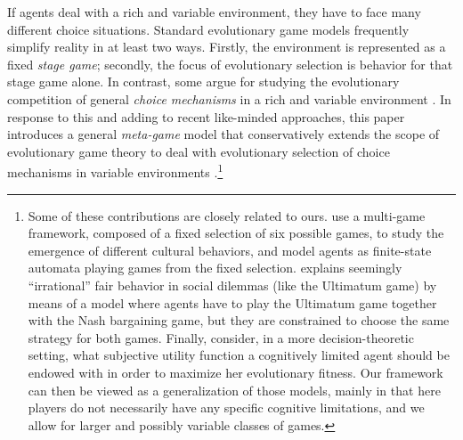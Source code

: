 \documentclass[fleqn,reqno,12pt]{article}
\theoremstyle{Satz}
\theoremstyle{Bsp}
\begin{document}

If agents deal with a rich and variable environment, they have to face many different choice
situations.  Standard evolutionary game models frequently simplify reality in at least two
ways. Firstly, the environment is represented as a fixed \emph{stage game}; secondly, the focus
of evolutionary selection is behavior for that stage game alone. In contrast, some argue for
studying the evolutionary competition of general \emph{choice mechanisms} in a rich and
variable environment
\citep[e.g.,][]{FawcettHamblin2013:Exposing-the-be,McNamara2013:Towards-a-Riche,HammStev12}. In
response to this and adding to recent like-minded approaches, this paper introduces a general
\emph{meta-game} model that conservatively extends the scope of evolutionary game theory to
deal with evolutionary selection of choice mechanisms in variable environments \citep[see
also][]{Harley1981:Learning-the-Ev,ZollmanSmead2010:Plasticity-and-,SmeadZollman2013:The-Stability-o,OConnor2016:Evolving-to-Gen,RayoBecker07,Zollman2008,SkyrmsZollman10,BednarPage07}.\footnote{Some
  of these contributions are closely related to ours. \citet{BednarPage07} use a
  multi-game framework, composed of a fixed selection of six possible games, to study the
  emergence of different cultural behaviors, and model agents as finite-state automata playing
  games from the fixed selection. \citet{Zollman2008} explains seemingly ``irrational'' fair
  behavior in social dilemmas (like the Ultimatum game) by means of a model where agents have
  to play the Ultimatum game together with the Nash bargaining game, but they are constrained
  to choose the same strategy for both games. Finally, \citet{RayoBecker07} consider, in a more
  decision-theoretic setting, what subjective utility function a cognitively limited agent
  should be endowed with in order to maximize her evolutionary fitness. Our framework can then
  be viewed as a generalization of those models, mainly in that here players do not necessarily
  have any specific cognitive limitations, and we allow for larger and possibly variable
  classes of games.}
\end{document}
